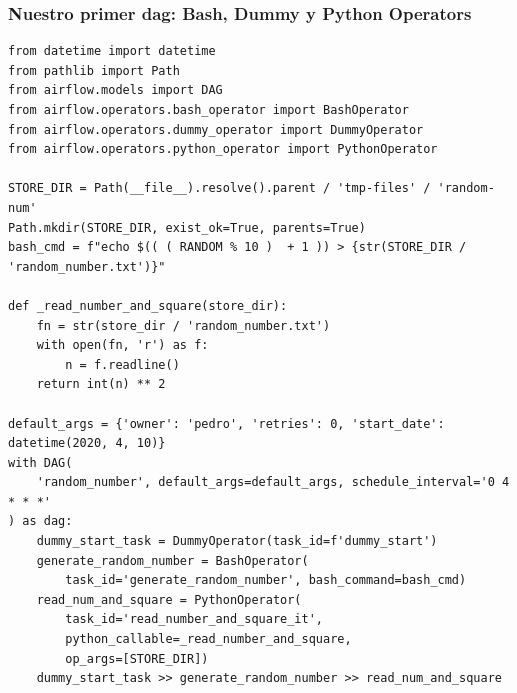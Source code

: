 \documentclass[leqno, 10pt, envcountsect]{beamer}
\numberwithin{equation}{section}
\theoremstyle{definition}
\theoremstyle{example}
\numberwithin{figure}{section}
\numberwithin{table}{section}
\begin{document}
\begin{frame}[fragile=singleslide]
  \frametitle{Nuestro primer dag: Bash, Dummy y Python Operators}
  \begin{verbatim}
from datetime import datetime
from pathlib import Path
from airflow.models import DAG
from airflow.operators.bash_operator import BashOperator
from airflow.operators.dummy_operator import DummyOperator
from airflow.operators.python_operator import PythonOperator

STORE_DIR = Path(__file__).resolve().parent / 'tmp-files' / 'random-num'
Path.mkdir(STORE_DIR, exist_ok=True, parents=True)
bash_cmd = f"echo $(( ( RANDOM % 10 )  + 1 )) > {str(STORE_DIR / 'random_number.txt')}"

def _read_number_and_square(store_dir):
    fn = str(store_dir / 'random_number.txt')
    with open(fn, 'r') as f:
        n = f.readline()
    return int(n) ** 2

default_args = {'owner': 'pedro', 'retries': 0, 'start_date': datetime(2020, 4, 10)}
with DAG(
    'random_number', default_args=default_args, schedule_interval='0 4 * * *'
) as dag:
    dummy_start_task = DummyOperator(task_id=f'dummy_start')
    generate_random_number = BashOperator(
        task_id='generate_random_number', bash_command=bash_cmd)
    read_num_and_square = PythonOperator(
        task_id='read_number_and_square_it',
        python_callable=_read_number_and_square,
        op_args=[STORE_DIR])
    dummy_start_task >> generate_random_number >> read_num_and_square
  \end{verbatim}

\end{frame}
\end{document}
